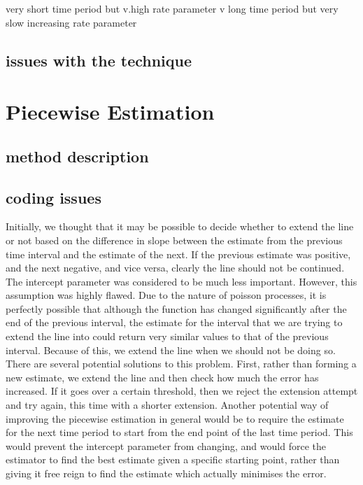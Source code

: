 \documentclass[11pt]{article}
\begin{document}
    very short time period but v.high rate parameter
    v long time period but very slow increasing rate parameter
\subsection{issues with the technique}
\label{sec-4.4}

\section{Piecewise Estimation}
\label{sec-5}

\subsection{method description}
\label{sec-5.1}

\subsection{coding issues}
\label{sec-5.2}

   Initially, we thought that it may be possible to decide whether to extend the line or not based on the difference in slope between the estimate from the previous time interval and the estimate of the next. If the previous estimate was positive, and the next negative, and vice versa, clearly the line should not be continued. The intercept parameter was considered to be much less important. However, this assumption was highly flawed. Due to the nature of poisson processes, it is perfectly possible that although the function has changed significantly after the end of the previous interval, the estimate for the interval that we are trying to extend the line into could return very similar values to that of the previous interval. Because of this, we extend the line when we should not be doing so. There are several potential solutions to this problem. First, rather than forming a new estimate, we extend the line and then check how much the error has increased. If it goes over a certain threshold, then we reject the extension attempt and try again, this time with a shorter extension. Another potential way of improving the piecewise estimation in general would be to require the estimate for the next time period to start from the end point of the last time period. This would prevent the intercept parameter from changing, and would force the estimator to find the best estimate given a specific starting point, rather than giving it free reign to find the estimate which actually minimises the error.
\end{document}
